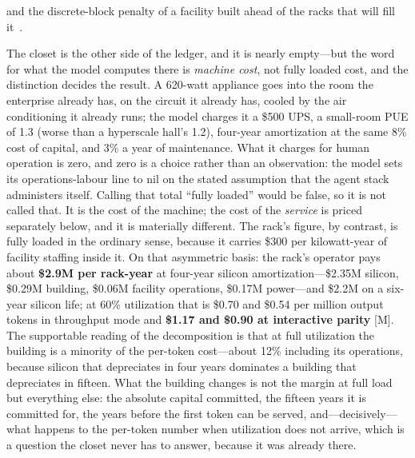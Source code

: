 and the discrete-block penalty of a facility built ahead of the racks that will fill it~\cite{matsuoka-dc-survey}.

The closet is the other side of the ledger, and it is nearly empty---but the word for what the model computes there is \emph{machine cost}, not fully loaded cost, and the distinction decides the result. A 620-watt appliance goes into the room the enterprise already has, on the circuit it already has, cooled by the air conditioning it already runs; the model charges it a \$500 UPS, a small-room PUE of 1.3 (worse than a hyperscale hall's 1.2), four-year amortization at the same 8\% cost of capital, and 3\% a year of maintenance. What it charges for human operation is zero, and zero is a choice rather than an observation: the model sets its operations-labour line to nil on the stated assumption that the agent stack administers itself. Calling that total ``fully loaded'' would be false, so it is not called that. It is the cost of the machine; the cost of the \emph{service} is priced separately below, and it is materially different. The rack's figure, by contrast, is fully loaded in the ordinary sense, because it carries \$300 per kilowatt-year of facility staffing inside it. On that asymmetric basis: the rack's operator pays about \textbf{\$2.9M per rack-year} at four-year silicon amortization---\$2.35M silicon, \$0.29M building, \$0.06M facility operations, \$0.17M power---and \$2.2M on a six-year silicon life; at 60\% utilization that is \$0.70 and \$0.54 per million output tokens in throughput mode and \textbf{\$1.17 and \$0.90 at interactive parity} [M]. The supportable reading of the decomposition is that at full utilization the building is a minority of the per-token cost---about 12\% including its operations, because silicon that depreciates in four years dominates a building that depreciates in fifteen. What the building changes is not the margin at full load but everything else: the absolute capital committed, the fifteen years it is committed for, the years before the first token can be served, and---decisively---what happens to the per-token number when utilization does not arrive, which is a question the closet never has to answer, because it was already there.

